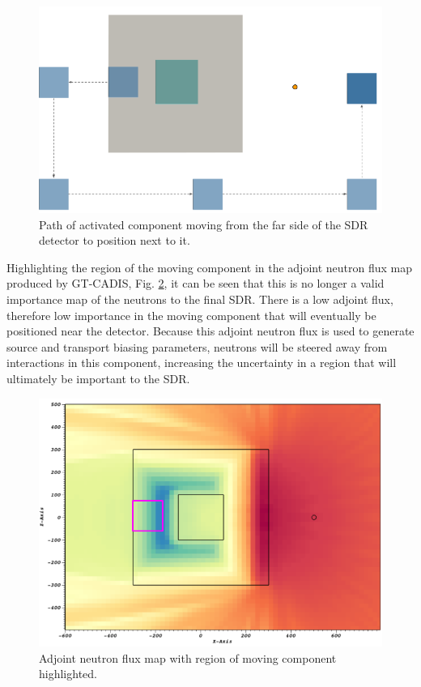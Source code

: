 \begin{figure} 
	\includegraphics[scale=0.6]{figs/moving_comp_path.png}
	\caption[Path of moving component]
	{Path of activated component moving from the far side of the SDR
	detector to position next to it.\label{fig:path}}
\end{figure}

Highlighting the region of the moving component in the  adjoint neutron flux
map produced by GT-CADIS, Fig. \ref{fig:highlight}, it can be seen that this 
is no longer a valid importance map
of the neutrons to the final SDR. There is a low adjoint flux, therefore low
importance in the moving component that will eventually be positioned 
near the detector.  Because this adjoint neutron flux is used to generate
source and transport biasing parameters, neutrons will be steered away from 
interactions in this component, increasing the uncertainty in a region that will
ultimately be important to the SDR. 

\begin{figure} 
	\includegraphics[scale=0.6]{figs/adj_n_highlight.png}
	\caption[Adjoint neutron flux map with region of moving component
	highlighted.]
	{Adjoint neutron flux map with region of moving component
	highlighted. \label{fig:highlight}}
\end{figure}


